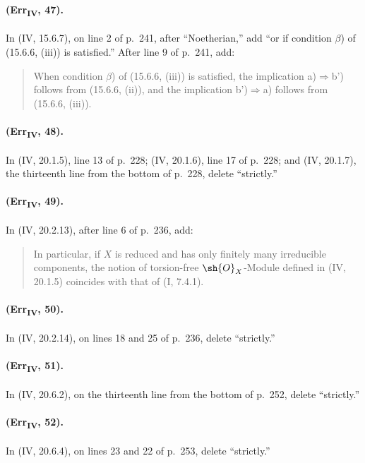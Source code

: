 \paragraph{(Err\textsubscript{IV}, 47).}
In (IV, 15.6.7), on line 2 of p.~241, after ``Noetherian,'' add ``or if
condition $\beta$) of (15.6.6, (iii)) is satisfied.''  After line 9 of
p.~241, add:
\begin{quote}
When condition $\beta$) of (15.6.6, (iii)) is satisfied, the implication
a)$\Rightarrow$b') follows from (15.6.6, (ii)), and the implication
b')$\Rightarrow$a) follows from (15.6.6, (iii)).
\end{quote}

\paragraph{(Err\textsubscript{IV}, 48).}
In (IV, 20.1.5), line 13 of p.~228; (IV, 20.1.6), line 17 of p.~228;
and (IV, 20.1.7), the thirteenth line from the bottom of p.~228, delete
``strictly.''

\paragraph{(Err\textsubscript{IV}, 49).}
In (IV, 20.2.13), after line 6 of p.~236, add:
\begin{quote}
In particular, if $X$ is reduced and has only finitely many irreducible
components, the notion of torsion-free $\sh{O}_X$-Module defined in
(IV, 20.1.5) coincides with that of (I, 7.4.1).
\end{quote}

\paragraph{(Err\textsubscript{IV}, 50).}
In (IV, 20.2.14), on lines 18 and 25 of p.~236, delete ``strictly.''

\paragraph{(Err\textsubscript{IV}, 51).}
In (IV, 20.6.2), on the thirteenth line from the bottom of p.~252,
delete ``strictly.''

\paragraph{(Err\textsubscript{IV}, 52).}
In (IV, 20.6.4), on lines 23 and 22 of p.~253, delete ``strictly.''

